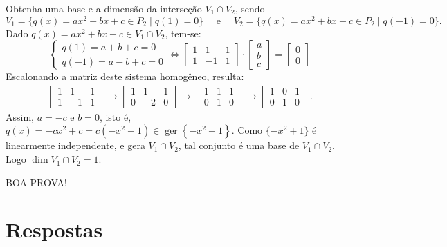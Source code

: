 \documentclass[12pt,a4paper]{article}
\newcommand*\ger[1]{\operatorname{ger}\left\{#1\right\}}
\begin{document}
\begin{ExerciseList}
\Exercise[title={2,5}] Obtenha uma base e a dimensão da interseção $V_1 \cap V_2$, sendo
\[
V_1 = \{ q(x) = ax^2 + bx + c \in P_2 \mid q(1) = 0\}
\quad \text{ e } \quad
V_2 = \{ q(x) = ax^2 + bx + c \in P_2 \mid q(-1) = 0\}.
\]
\Answer Dado $q(x) = ax^2 + bx + c \in V_1 \cap V_2$, tem-se:
\[
\begin{cases}
q(1)  = a + b + c = 0\\
q(-1) = a - b + c = 0
\end{cases}
\Leftrightarrow
\begin{bmatrix}
1 & 1 & 1\\
1 & -1 & 1
\end{bmatrix}
\cdot
\begin{bmatrix}
a \\ b \\ c
\end{bmatrix}
=
\begin{bmatrix}
0 \\ 0
\end{bmatrix}
\]
Escalonando a matriz deste sistema homogêneo, resulta:
\begin{align*}
\begin{bmatrix}
1 & 1 & 1\\
1 & -1 & 1
\end{bmatrix}
\rightarrow
\begin{bmatrix}
1 & 1 & 1\\
0 & -2 & 0
\end{bmatrix}
\rightarrow
\begin{bmatrix}
1 & 1 & 1\\
0 & 1 & 0
\end{bmatrix}
\rightarrow
\begin{bmatrix}
1 & 0 & 1\\
0 & 1 & 0
\end{bmatrix}.
\end{align*}
Assim, $a = -c$ e $b=0$, isto é, $q(x) = -cx^2+c = c(-x^2 + 1) \in \ger{-x^2 + 1}$. Como $\{-x^2 + 1\}$ é linearmente independente, e gera $V_1 \cap V_2$, tal conjunto é uma base de $V_1 \cap V_2$. Logo $\dim{V_1 \cap V_2} = 1$.
\end{ExerciseList}

\begin{center}
BOA PROVA!
\end{center}


\newpage
\restoregeometry
\section*{Respostas}
\shipoutAnswer
\end{document}
